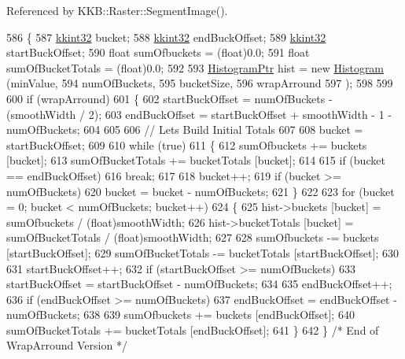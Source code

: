 Referenced by K\+K\+B\+::\+Raster\+::\+Segment\+Image().


\begin{DoxyCode}
586 \{
587   \hyperlink{namespace_k_k_b_a8fa4952cc84fda1de4bec1fbdd8d5b1b}{kkint32}  bucket;
588   \hyperlink{namespace_k_k_b_a8fa4952cc84fda1de4bec1fbdd8d5b1b}{kkint32}  endBuckOffset;
589   \hyperlink{namespace_k_k_b_a8fa4952cc84fda1de4bec1fbdd8d5b1b}{kkint32}  startBuckOffset;
590   \textcolor{keywordtype}{float} sumOfbuckets      = (float)0.0;
591   \textcolor{keywordtype}{float} sumOfBucketTotals = (float)0.0;
592 
593   \hyperlink{class_k_k_b_1_1_histogram}{HistogramPtr} hist = \textcolor{keyword}{new} \hyperlink{class_k_k_b_1_1_histogram_a9966e27fdb984bcdb227b29514a54021}{Histogram} (minValue, 
594                                      numOfBuckets, 
595                                      bucketSize,
596                                      wrapArround
597                                     );
598 
599 
600   \textcolor{keywordflow}{if}  (wrapArround)
601   \{
602     startBuckOffset = numOfBuckets - (smoothWidth / 2);
603     endBuckOffset   = startBuckOffset + smoothWidth - 1 - numOfBuckets;
604 
605 
606     \textcolor{comment}{// Lets Build Initial Totals}
607 
608     bucket = startBuckOffset;
609 
610     \textcolor{keywordflow}{while}  (\textcolor{keyword}{true})
611     \{
612       sumOfbuckets      += buckets      [bucket];
613       sumOfBucketTotals += bucketTotals [bucket];
614 
615       \textcolor{keywordflow}{if}  (bucket == endBuckOffset)
616         \textcolor{keywordflow}{break};
617 
618       bucket++;
619       \textcolor{keywordflow}{if}  (bucket >= numOfBuckets)
620         bucket = bucket - numOfBuckets;
621     \}
622 
623     \textcolor{keywordflow}{for}  (bucket = 0;  bucket < numOfBuckets;  bucket++)
624     \{
625       hist->buckets      [bucket] = sumOfbuckets      / (float)smoothWidth;
626       hist->bucketTotals [bucket] = sumOfBucketTotals / (float)smoothWidth;
627 
628       sumOfbuckets      -= buckets      [startBuckOffset];
629       sumOfBucketTotals -= bucketTotals [startBuckOffset];
630 
631       startBuckOffset++;
632       \textcolor{keywordflow}{if}  (startBuckOffset >= numOfBuckets)
633         startBuckOffset = startBuckOffset - numOfBuckets;
634 
635       endBuckOffset++;
636       \textcolor{keywordflow}{if}  (endBuckOffset >= numOfBuckets)
637         endBuckOffset = endBuckOffset - numOfBuckets;
638 
639       sumOfbuckets      += buckets      [endBuckOffset];
640       sumOfBucketTotals += bucketTotals [endBuckOffset];
641     \}
642   \}  \textcolor{comment}{/* End of WrapArround Version */}

\end{DoxyCode}
